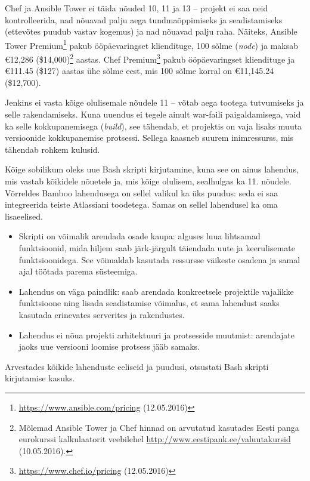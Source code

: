 \documentclass[12pt]{article}
\begin{document}
  Chef ja Ansible Tower ei täida nõuded 10, 11 ja 13 \--- projekt ei saa neid kontrolleerida, nad nõuavad palju aega tundmaõppimiseks ja seadistamiseks (ettevõtes puudub vastav kogemus) ja nad nõuavad palju raha. Näiteks, Ansible Tower Premium\footnote{\url{https://www.ansible.com/pricing} (12.05.2016)} pakub ööpäevaringset kliendituge, 100 sõlme (\textit{node}) ja maksab \euro 12,286 (\$14,000)\footnote{Mõlemad Ansible Tower ja Chef hinnad on arvutatud kasutades Eesti panga eurokurssi kalkulaatorit veebilehel \url{http://www.eestipank.ee/valuutakursid} (10.05.2016).} aastas. Chef Premium\footnote{\url{https://www.chef.io/pricing} (12.05.2016)} pakub ööpäevaringset kliendituge ja \euro 111.45 (\$127) aastas ühe sõlme eest, mis 100 sõlme korral on \euro 11,145.24 (\$12,700).
  
  Jenkins ei vasta kõige olulisemale nõudele 11 \--- võtab aega tootega tutvumiseks ja selle rakendamiseks. Kuna uuendus ei tegele ainult war\--faili paigaldamisega, vaid ka selle kokkupanemisega (\textit{build}), see tähendab, et projektis on vaja lisaks muuta versioonide kokkupanemise protsessi. Sellega kaasneb suurem inimressurss, mis tähendab rohkem kulusid.
  
  \newpage
  
  Kõige sobilikum oleks uue Bash skripti kirjutamine, kuna see on ainus lahendus, mis vastab kõikidele nõuetele ja, mis kõige olulisem, sealhulgas ka 11. nõudele. Võrreldes Bamboo lahendusega on sellel valikul ka üks puudus: seda ei saa integreerida teiste Atlassiani toodetega. Samas on sellel lahendusel ka oma lisaeelised.
  \begin{itemize}
    \item Skripti on võimalik arendada osade kaupa: alguses luua lihtsamad funktsioonid, mida hiljem saab järk\--järgult täiendada uute ja keerulisemate funktsioonidega. See võimaldab kasutada ressursse väikeste osadena ja samal ajal töötada parema süsteemiga.
    \item Lahendus on väga paindlik: saab arendada konkreetsele projektile vajalikke funktsioone ning lisada seadistamise võimalus, et sama lahendust saaks kasutada erinevates serverites ja rakendustes.
    \item Lahendus ei nõua projekti arhitektuuri ja protsesside muutmist: arendajate jaoks uue versiooni loomise protsess jääb samaks.
  \end{itemize}
  
  Arvestades kõikide lahenduste eeliseid ja puudusi, otsustati Bash skripti kirjutamise kasuks.
  
\end{document}
